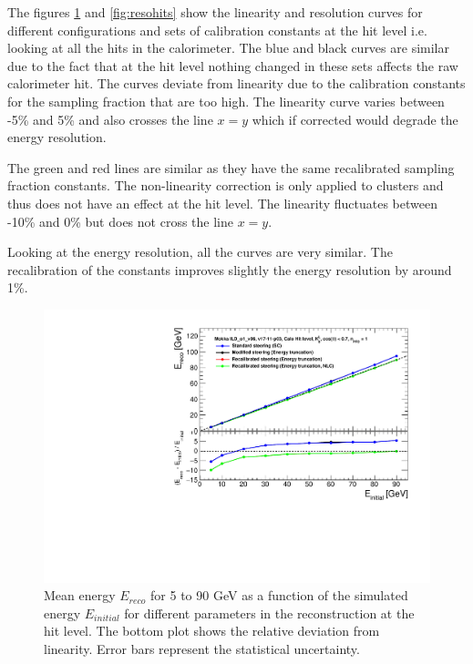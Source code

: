 The figures \ref{fig:linhits} and \ref{fig:resohits} show the linearity and resolution curves for different configurations and sets of calibration constants at the hit level i.e. looking at all the hits in the calorimeter. The blue and black curves are similar due to the fact that at the hit level nothing changed in these sets affects the raw calorimeter hit. The curves deviate from linearity due to the calibration constants for the sampling fraction that are too high. The linearity curve varies between -5\% and 5\% and also crosses the line $x=y$ which if corrected would degrade the energy resolution.

The green and red lines are similar as they have the same recalibrated sampling fraction constants. The non-linearity correction is only applied to clusters and thus does not have an effect at the hit level. The linearity fluctuates between -10\% and 0\% but does not cross the line $x=y$.

Looking at the energy resolution, all the curves are very similar. The recalibration of the constants improves slightly the energy resolution by around 1\%.
\begin{figure}[htbp!]
  \centering
  \includegraphics[width=0.7\linewidth]{../Thesis_Plots/ILD/NoSmearing/Plots_Comparison/Comparison_linearity_Curves_Hits}
  \caption{Mean energy $E_{reco}$ for 5 to 90 GeV \kzeroL{} as a function of the simulated energy $E_{initial}$ for different parameters in the reconstruction at the hit level. The bottom plot shows the relative deviation from linearity. Error bars represent the statistical uncertainty.} \label{fig:linhits}
\end{figure}

